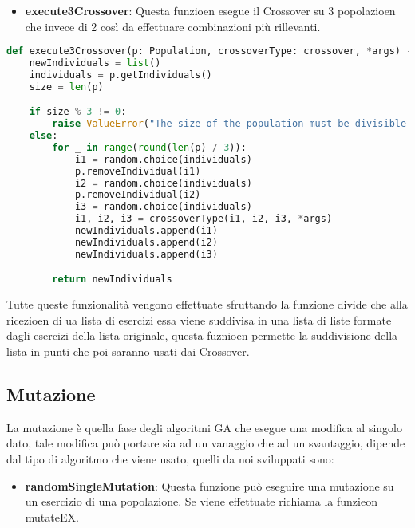 \documentclass{article}
\begin{document}
\begin{itemize}
\item\textbf{execute3Crossover}: Questa funzioen esegue il Crossover su 3 popolazioen che invece di 2 così da effettuare combinazioni più rillevanti.
\end{itemize}

\begin{lstlisting}[language=Python, breaklines, no caption]
def execute3Crossover(p: Population, crossoverType: crossover, *args) -> list[Individual]:
    newIndividuals = list()
    individuals = p.getIndividuals()
    size = len(p)

    if size % 3 != 0:
        raise ValueError("The size of the population must be divisible by 3!")
    else:
        for _ in range(round(len(p) / 3)):
            i1 = random.choice(individuals)
            p.removeIndividual(i1)
            i2 = random.choice(individuals)
            p.removeIndividual(i2)
            i3 = random.choice(individuals)
            i1, i2, i3 = crossoverType(i1, i2, i3, *args)
            newIndividuals.append(i1)
            newIndividuals.append(i2)
            newIndividuals.append(i3)

        return newIndividuals
\end{lstlisting}

Tutte queste funzionalità vengono effettuate sfruttando la funzione divide che alla ricezioen di ua lista di esercizi essa viene suddivisa in una lista di liste formate dagli esercizi della lista originale, questa fuznioen permette la suddivisione della lista in punti che poi saranno usati dai Crossover.

\pagebreak

\subsection{Mutazione}

La mutazione è quella fase degli algoritmi GA che esegue una modifica al singolo dato, tale modifica può portare sia ad un vanaggio che ad un svantaggio, dipende dal tipo di algoritmo che viene usato, quelli da noi sviluppati sono:

\begin{itemize}
\item\textbf{randomSingleMutation}: Questa funzione può eseguire una mutazione su un esercizio di una popolazione. Se viene effettuate richiama la funzieon mutateEX.
\end{itemize}
\end{document}
